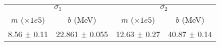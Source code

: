 \begin{tabular}{cc|cc}
\multicolumn{2}{c|}{$\sigma_1$} & \multicolumn{2}{|c}{$\sigma_2$} \\
$m$ ($\times1e5$) & $b$ (MeV) & $m$ ($\times1e5$) & $b$ (MeV) \\
\hline
8.56 $\pm$ 0.11 & 22.861 $\pm$ 0.055 & 12.63 $\pm$ 0.27 & 40.87 $\pm$ 0.14\\
\end{tabular}
